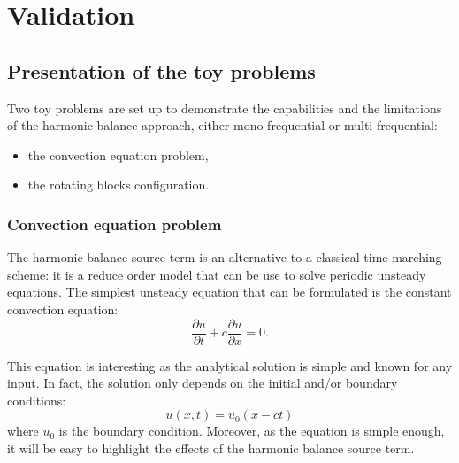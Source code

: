 \chapter{Validation} %
\label{cha:validation}

\section{Presentation of the toy problems}

Two toy problems are set up to demonstrate
the capabilities and the limitations of the harmonic
balance approach, either mono-frequential or multi-frequential:
\begin{itemize}
  \item the convection equation problem,
  \item the rotating blocks configuration.
\end{itemize}

\subsection{Convection equation problem} %
\label{sub:convection_equation_problem}

The harmonic balance source term is an alternative to
a classical time marching scheme: it is a reduce
order model that can be use to solve periodic unsteady equations.
The simplest unsteady equation
that can be formulated is the constant convection equation:
\begin{equation}
  \label{eq:convection}
  \frac{\partial u}{\partial t} + c \frac{\partial u}{\partial x} = 0.
\end{equation}

This equation is interesting as the analytical solution is simple
and known for any input. In fact, the solution only depends on the 
initial and/or boundary conditions:
\begin{equation}
  \label{eq:solconvanalytic}
    u(x, t) = u_0(x - ct)
\end{equation}
where $u_0$ is the boundary condition. Moreover, as the equation
is simple enough, it will be easy to highlight the effects of the
harmonic balance source term.

